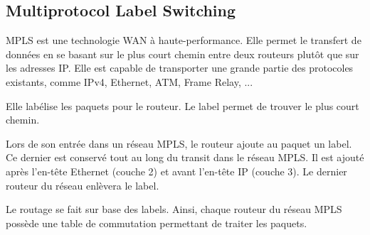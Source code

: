 \subsection{Multiprotocol Label Switching}
MPLS est une technologie WAN à haute-performance.
Elle permet le transfert de données en se basant sur le plus court chemin entre deux routeurs plutôt que sur les adresses IP. 
Elle est capable de transporter une grande partie des protocoles existants, comme IPv4, Ethernet, ATM, Frame Relay, ...

Elle labélise les paquets pour le routeur. 
Le label permet de trouver le plus court chemin.

Lors de son entrée dans un réseau MPLS, le routeur ajoute au paquet un label.
Ce dernier est conservé tout au long du transit dans le réseau MPLS.
Il est ajouté après l'en-tête Ethernet (couche 2) et avant l'en-tête IP (couche 3).
Le dernier routeur du réseau enlèvera le label.

Le routage se fait sur base des labels.
Ainsi, chaque routeur du réseau MPLS possède une table de commutation permettant de traiter les paquets.